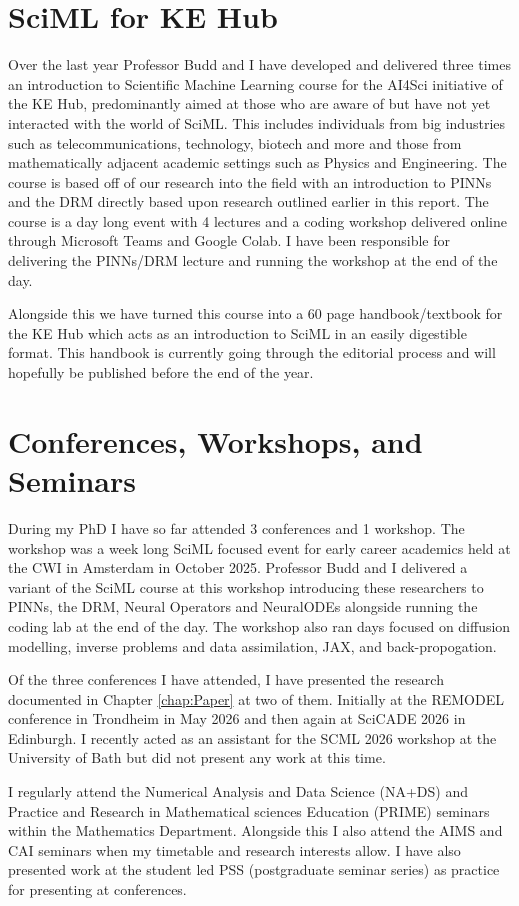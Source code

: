 \documentclass[11pt, onecolumn]{report}
\begin{document}
\section{SciML for KE Hub}
Over the last year Professor Budd and I have developed and delivered three times an introduction to Scientific Machine Learning course for the AI4Sci initiative of the KE Hub, predominantly aimed at those who are aware of but have not yet interacted with the world of SciML. This includes individuals from big industries such as telecommunications, technology, biotech and more and those from mathematically adjacent academic settings such as Physics and Engineering. The course is based off of our research into the field with an introduction to PINNs and the DRM directly based upon research outlined earlier in this report. The course is a day long event with 4 lectures and a coding workshop delivered online through Microsoft Teams and Google Colab. I have been responsible for delivering the PINNs/DRM lecture and running the workshop at the end of the day.

Alongside this we have turned this course into a 60 page handbook/textbook for the KE Hub which acts as an introduction to SciML in an easily digestible format. This handbook is currently going through the editorial process and will hopefully be published before the end of the year.

\section{Conferences, Workshops, and Seminars}
During my PhD I have so far attended 3 conferences and 1 workshop. The workshop was a week long SciML focused event for early career academics held at the CWI in Amsterdam in October 2025. Professor Budd and I delivered a variant of the SciML course at this workshop introducing these researchers to PINNs, the DRM, Neural Operators and NeuralODEs alongside running the coding lab at the end of the day. The workshop also ran days focused on diffusion modelling, inverse problems and data assimilation, JAX, and back-propogation.

Of the three conferences I have attended, I have presented the research documented in Chapter \ref{chap:Paper} at two of them. Initially at the REMODEL conference in Trondheim in May 2026 and then again at SciCADE 2026 in Edinburgh. I recently acted as an assistant for the SCML 2026 workshop at the University of Bath but did not present any work at this time.

I regularly attend the Numerical Analysis and Data Science (NA+DS) and Practice and Research in Mathematical sciences Education (PRIME) seminars within the Mathematics Department. Alongside this I also attend the AIMS and CAI seminars when my timetable and research interests allow. I have also presented work at the student led PSS (postgraduate seminar series) as practice for presenting at conferences. 
\end{document}
